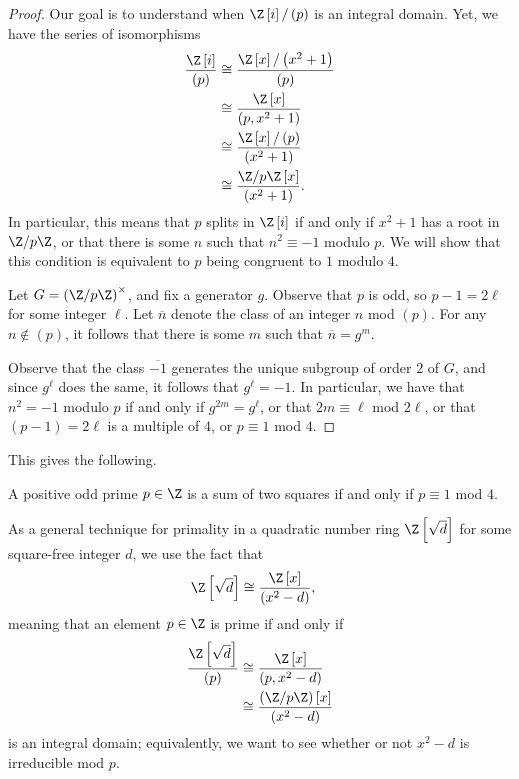 \documentclass[10pt]{mypackage}
\begin{document}
\begin{proof}
  Our goal is to understand when $\Z\left[ i \right]/\left( p \right)$ is an integral domain. Yet, we have the series of isomorphisms
  \begin{align*}
    \frac{\Z\left[ i \right]}{\left( p \right)} &\cong \frac{\Z\left[ x \right]/\left( x^2 + 1 \right)}{\left( p \right)}\\
                                                &\cong \frac{\Z\left[ x \right]}{\left( p,x^2 + 1 \right)}\\
                                                &\cong \frac{\Z\left[ x \right]/\left( p \right)}{\left( x^2 + 1 \right)}\\
                                                &\cong \frac{\Z/p\Z\left[ x \right]}{\left( x^2 + 1 \right)}.
  \end{align*}
  In particular, this means that $p$ splits in $\Z\left[ i \right]$ if and only if $x^2 + 1$ has a root in $\Z/p\Z$, or that there is some $n$ such that $n^2\equiv -1$ modulo $p$. We will show that this condition is equivalent to $p$ being congruent to $1$ modulo $4$.

  Let $G = \left( \Z/p\Z \right)^{\times}$, and fix a generator $g$. Observe that $p$ is odd, so $p-1 = 2\ell$ for some integer $\ell$. Let $ \overline{n} $ denote the class of an integer $n$ mod $\left( p \right)$. For any $n\notin \left( p \right)$, it follows that there is some $m$ such that $ \overline{n} = g^{m} $.

  Observe that the class $ \overline{-1} $ generates the unique subgroup of order $2$ of $G$, and since $g^{\ell}$ does the same, it follows that $g^{\ell} = -1$. In particular, we have that $n^2 = -1$ modulo $p$ if and only if $g^{2m} = g^{\ell}$, or that $2m\equiv \ell$ mod $2\ell$, or that $\left( p-1 \right) = 2\ell$ is a multiple of $4$, or $p\equiv 1$ mod $4$.
\end{proof}
This gives the following.
\begin{theorem}
  A positive odd prime $p\in \Z$ is a sum of two squares if and only if $p\equiv 1$ mod $4$.
\end{theorem}
As a general technique for primality in a quadratic number ring $\Z\left[ \sqrt{d} \right]$ for some square-free integer $d$, we use the fact that
\begin{align*}
  \Z\left[ \sqrt{d} \right] &\cong \frac{\Z\left[ x \right]}{\left( x^2-d \right)},
\end{align*}
meaning that an element $p\in \Z$ is prime if and only if
\begin{align*}
  \frac{\Z\left[ \sqrt{d} \right]}{\left( p \right)} &\cong \frac{\Z\left[ x \right]}{\left( p,x^2-d \right)}\\
                                                     &\cong \frac{\left( \Z/p\Z \right)\left[ x \right]}{\left( x^2-d \right)}
\end{align*}
is an integral domain; equivalently, we want to see whether or not $x^2-d$ is irreducible mod $p$.
\end{document}

